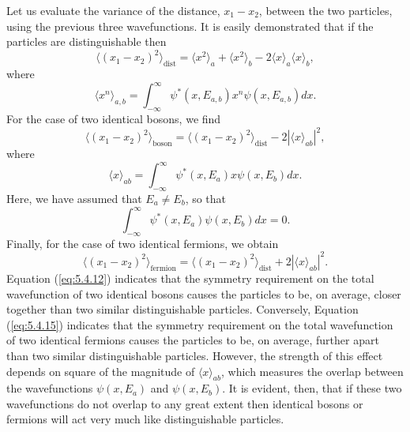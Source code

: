 Let us evaluate the variance of the distance, $x_{1}-x_{2}$, between the two particles, using the previous three wavefunctions. It is easily demonstrated that if the particles are distinguishable then
\begin{equation}
	\langle (x_1 - x_2)^2 \rangle_{\text{dist}} = \langle x^2 \rangle_a + \langle x^2 \rangle_b - 2\langle x \rangle_a \langle x \rangle_b,
	\label{eq:5.4.10}
\end{equation}
where
\begin{equation}
	\langle x^{n} \rangle_{a, b} = \int_{-\infty}^{\infty} \psi^{*}(x, E_{a, b}) x^{n} \psi(x, E_{a, b}) dx.
	\label{eq:5.4.11}
\end{equation}
For the case of two identical bosons, we find
\begin{equation}
	\langle (x_{1} - x_{2})^{2} \rangle_{\text{boson}} = \langle (x_{1} - x_{2})^{2} \rangle_{\text{dist}} - 2|\langle x \rangle_{ab}|^{2},
	\label{eq:5.4.12}
\end{equation}
where
\begin{equation}
	\langle x \rangle_{ab} = \int_{-\infty}^{\infty} \psi^{*}(x, E_{a}) x \psi(x, E_{b}) dx.
	\label{eq:5.4.13}
\end{equation}
Here, we have assumed that $E_{a} \neq E_{b}$, so that
\begin{equation}
	\int_{-\infty}^{\infty} \psi^{*}(x, E_{a}) \psi(x, E_{b}) dx = 0.
	\label{eq:5.4.14}
\end{equation}
Finally, for the case of two identical fermions, we obtain
\begin{equation}
	\langle (x_1 - x_2)^2 \rangle_{\text{fermion}} = \langle (x_1 - x_2)^2 \rangle_{\text{dist}} + 2|\langle x \rangle_{ab}|^2.
	\label{eq:5.4.15}
\end{equation}
Equation (\ref{eq:5.4.12}) indicates that the symmetry requirement on the total wavefunction of two identical bosons causes the particles to be, on average, closer together than two similar distinguishable particles. Conversely, Equation (\ref{eq:5.4.15}) indicates that the symmetry requirement on the total wavefunction of two identical fermions causes the particles to be, on average, further apart than two similar distinguishable particles. However, the strength of this effect depends on square of the magnitude of $\langle x \rangle_{ab}$, which measures the overlap between the wavefunctions $\psi(x, E_{a})$ and $\psi(x, E_{b})$. It is evident, then, that if these two wavefunctions do not overlap to any great extent then identical bosons or fermions will act very much like distinguishable particles.

